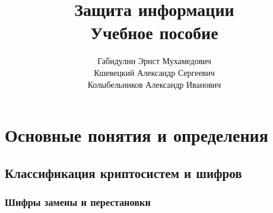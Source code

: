 \documentclass[10pt,a4paper]{book}
\begin{document}


\title{Защита информации \\ Учебное пособие}
\author{Габидулин Эрнст Мухамедович \\ Кшевецкий Александр Сергеевич \\ Колыбельников Александр Иванович}
\date{
}
\maketitle
\setcounter{page}{3}

\newpage
\setcounter{tocdepth}{2}
\tableofcontents
\newpage




\chapter{Основные понятия и определения}





\section{Классификация криптосистем и шифров}







\subsection{Шифры замены и перестановки}
\end{document}

